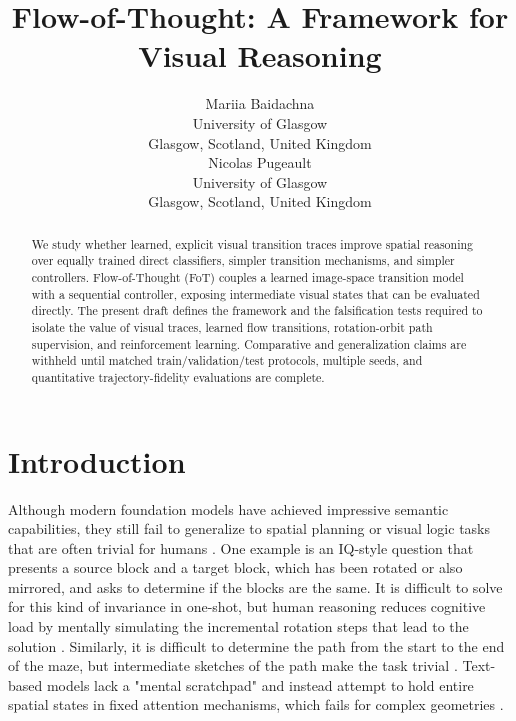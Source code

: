 \documentclass{article}
\title{Flow-of-Thought: A Framework for Visual Reasoning}
\author{
  Mariia Baidachna \\
  University of Glasgow \\
  Glasgow, Scotland, United Kingdom \\
  \And
  Nicolas Pugeault \\
  University of Glasgow \\
  Glasgow, Scotland, United Kingdom \\
}
\begin{document}
\maketitle

\begin{abstract}
We study whether learned, explicit visual transition traces improve spatial reasoning over equally trained direct classifiers, simpler transition mechanisms, and simpler controllers. Flow-of-Thought (FoT) couples a learned image-space transition model with a sequential controller, exposing intermediate visual states that can be evaluated directly. The present draft defines the framework and the falsification tests required to isolate the value of visual traces, learned flow transitions, rotation-orbit path supervision, and reinforcement learning. Comparative and generalization claims are withheld until matched train/validation/test protocols, multiple seeds, and quantitative trajectory-fidelity evaluations are complete.

\end{abstract}

\section{Introduction}


Although modern foundation models have achieved impressive semantic capabilities, they still fail to generalize to spatial planning or visual logic tasks that are often trivial for humans \citep{vsp2025, topobench2026}. One example is an IQ-style question that presents a source block and a target block, which has been rotated or also mirrored, and asks to determine if the blocks are the same. It is difficult to solve for this kind of invariance in one-shot, but human reasoning reduces cognitive load by mentally simulating the incremental rotation steps that lead to the solution \citep{shepard1971mental}. Similarly, it is difficult to determine the path from the start to the end of the maze, but intermediate sketches of the path make the task trivial \citep{lotfi2024cos}. Text-based models lack a "mental scratchpad" and instead attempt to hold entire spatial states in fixed attention mechanisms, which fails for complex geometries \cite{zhang2024mindseye, latentsketchpad2025}.
\end{document}
